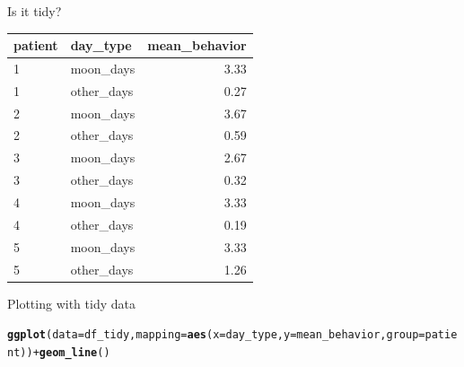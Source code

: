 \documentclass[10pt]{beamer}\usepackage[]{graphicx}\usepackage[]{color}
\makeatletter
\newcommand{\hlopt}[1]{\textcolor[rgb]{0,0,0}{#1}}%
\newcommand{\hlstd}[1]{\textcolor[rgb]{0.345,0.345,0.345}{#1}}%
\newcommand{\hlkwc}[1]{\textcolor[rgb]{0.333,0.667,0.333}{#1}}%
\newcommand{\hlkwd}[1]{\textcolor[rgb]{0.737,0.353,0.396}{\textbf{#1}}}%
\newenvironment{kframe}{%
 \def\at@end@of@kframe{}%
 \ifinner\ifhmode%
  \def\at@end@of@kframe{\end{minipage}}%
  \begin{minipage}{\columnwidth}%
 \fi\fi%
 \def\FrameCommand##1{\hskip\@totalleftmargin \hskip-\fboxsep
 \colorbox{shadecolor}{##1}\hskip-\fboxsep
     \hskip-\linewidth \hskip-\@totalleftmargin \hskip\columnwidth}%
 \MakeFramed {\advance\hsize-\width
   \@totalleftmargin\z@ \linewidth\hsize
   \@setminipage}}%
 {\par\unskip\endMakeFramed%
 \at@end@of@kframe}
\newenvironment{knitrout}{}{} %
\makeatother
\begin{document}
\begin{frame}[fragile]{Is it tidy?}
	
\begin{knitrout}\footnotesize
{}\color{fgcolor}
\begin{tabular}{l|l|r}
\hline
patient & day\_type & mean\_behavior\\
\hline
1 & moon\_days & 3.33\\
\hline
1 & other\_days & 0.27\\
\hline
2 & moon\_days & 3.67\\
\hline
2 & other\_days & 0.59\\
\hline
3 & moon\_days & 2.67\\
\hline
3 & other\_days & 0.32\\
\hline
4 & moon\_days & 3.33\\
\hline
4 & other\_days & 0.19\\
\hline
5 & moon\_days & 3.33\\
\hline
5 & other\_days & 1.26\\
\hline
\end{tabular}


\end{knitrout}
	
	
\end{frame}


\begin{frame}[fragile]{Plotting with tidy data}
	
\begin{knitrout}\tiny
{}\color{fgcolor}\begin{kframe}
\begin{alltt}
\hlkwd{ggplot}\hlstd{(}\hlkwc{data} \hlstd{= df_tidy,} \hlkwc{mapping} \hlstd{=} \hlkwd{aes}\hlstd{(}\hlkwc{x} \hlstd{= day_type,} \hlkwc{y} \hlstd{= mean_behavior,} \hlkwc{group} \hlstd{= patient))} \hlopt{+} \hlkwd{geom_line}\hlstd{()}
\end{alltt}
\end{kframe}
\end{knitrout}
	
\begin{knitrout}\tiny
{}\color{fgcolor}\begin{kframe}


{\ttfamily\noindent\bfseries\color{errorcolor}{Error in loadNamespace(name): there is no package called 'ggpubr'}}\end{kframe}
\end{knitrout}
	
	
\end{frame}
\end{document}
